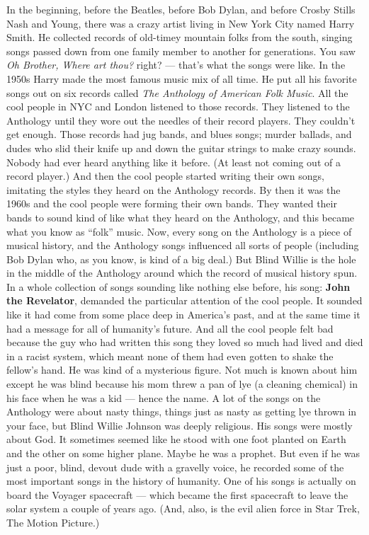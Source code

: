 \documentclass[letterpaper,]{article}
\begin{document}
In the beginning, before the Beatles, before Bob Dylan, and before
Crosby Stills Nash and Young, there was a crazy artist living in New
York City named Harry Smith. He collected records of old-timey mountain
folks from the south, singing songs passed down from one family member
to another for generations. You saw \emph{Oh Brother, Where art thou?}
right? --- that's what the songs were like. In the 1950s Harry made the
most famous music mix of all time. He put all his favorite songs out on
six records called \emph{The Anthology of American Folk Music}. All the
cool people in NYC and London listened to those records. They listened
to the Anthology until they wore out the needles of their record
players. They couldn't get enough. Those records had jug bands, and
blues songs; murder ballads, and dudes who slid their knife up and down
the guitar strings to make crazy sounds. Nobody had ever heard anything
like it before. (At least not coming out of a record player.) And then
the cool people started writing their own songs, imitating the styles
they heard on the Anthology records. By then it was the 1960s and the
cool people were forming their own bands. They wanted their bands to
sound kind of like what they heard on the Anthology, and this became
what you know as ``folk'' music. Now, every song on the Anthology is a
piece of musical history, and the Anthology songs influenced all sorts
of people (including Bob Dylan who, as you know, is kind of a big deal.)
But Blind Willie is the hole in the middle of the Anthology around which
the record of musical history spun. In a whole collection of songs
sounding like nothing else before, his song: \textbf{John the
Revelator}, demanded the particular attention of the cool people. It
sounded like it had come from some place deep in America's past, and at
the same time it had a message for all of humanity's future. And all the
cool people felt bad because the guy who had written this song they
loved so much had lived and died in a racist system, which meant none of
them had even gotten to shake the fellow's hand. He was kind of a
mysterious figure. Not much is known about him except he was blind
because his mom threw a pan of lye (a cleaning chemical) in his face
when he was a kid --- hence the name. A lot of the songs on the
Anthology were about nasty things, things just as nasty as getting lye
thrown in your face, but Blind Willie Johnson was deeply religious. His
songs were mostly about God. It sometimes seemed like he stood with one
foot planted on Earth and the other on some higher plane. Maybe he was a
prophet. But even if he was just a poor, blind, devout dude with a
gravelly voice, he recorded some of the most important songs in the
history of humanity. One of his songs is actually on board the Voyager
spacecraft --- which became the first spacecraft to leave the solar
system a couple of years ago. (And, also, is the evil alien force in
Star Trek, The Motion Picture.)
\end{document}

